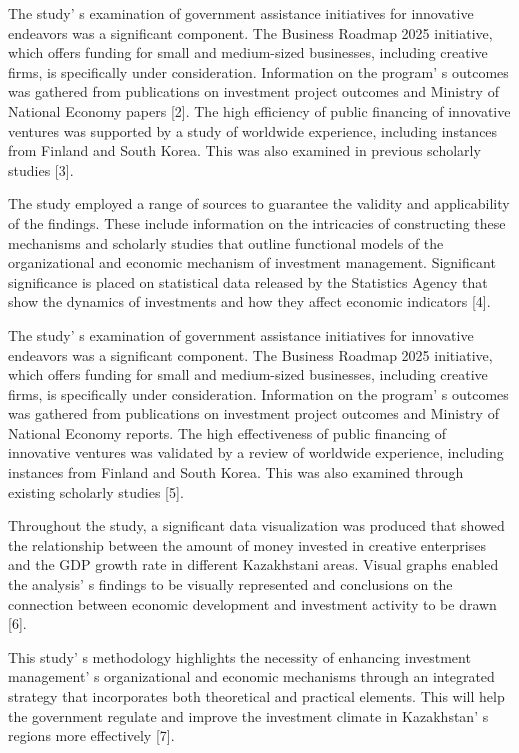 \begin{multicols}{2}
The study' s examination of government assistance
initiatives for innovative endeavors was a significant component. The
Business Roadmap 2025 initiative, which offers funding for small and
medium-sized businesses, including creative firms, is specifically under
consideration. Information on the program' s outcomes was
gathered from publications on investment project outcomes and Ministry
of National Economy papers {[}2{]}. The high efficiency of public
financing of innovative ventures was supported by a study of worldwide
experience, including instances from Finland and South Korea. This was
also examined in previous scholarly studies {[}3{]}.

The study employed a range of sources to guarantee the validity and
applicability of the findings. These include information on the
intricacies of constructing these mechanisms and scholarly studies that
outline functional models of the organizational and economic mechanism
of investment management. Significant significance is placed on
statistical data released by the Statistics Agency that show the
dynamics of investments and how they affect economic indicators {[}4{]}.

The study' s examination of government assistance
initiatives for innovative endeavors was a significant component. The
Business Roadmap 2025 initiative, which offers funding for small and
medium-sized businesses, including creative firms, is specifically under
consideration. Information on the program' s outcomes was
gathered from publications on investment project outcomes and Ministry
of National Economy reports. The high effectiveness of public financing
of innovative ventures was validated by a review of worldwide
experience, including instances from Finland and South Korea. This was
also examined through existing scholarly studies {[}5{]}.

Throughout the study, a significant data visualization was produced that
showed the relationship between the amount of money invested in creative
enterprises and the GDP growth rate in different Kazakhstani areas.
Visual graphs enabled the analysis' s findings to be
visually represented and conclusions on the connection between economic
development and investment activity to be drawn {[}6{]}.

This study' s methodology highlights the necessity of
enhancing investment management' s organizational and
economic mechanisms through an integrated strategy that incorporates
both theoretical and practical elements. This will help the government
regulate and improve the investment climate in
Kazakhstan' s regions more effectively {[}7{]}.


\end{multicols}
